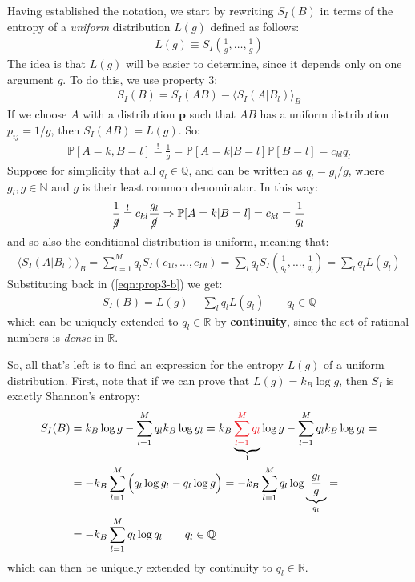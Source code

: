 \documentclass[../../main.tex]{subfiles}
\begin{document}
Having established the notation, we start by rewriting $S_I(B)$ in terms of the entropy of a \textit{uniform} distribution $L(g)$ defined as follows:
\begin{align*}
    L(g) \equiv S_{I}\left(\frac{1}{g},\dots,\frac{1}{g}\right)
\end{align*}
The idea is that $L(g)$ will be easier to determine, since it depends only on one argument $g$. To do this, we use property $3$:
\begin{align}\label{eqn:prop3-b}
    S_I(B) = S_I(AB) - \langle S_I(A|B_l) \rangle_B
\end{align}
If we choose $A$ with a distribution $\bm{p}$ such that $AB$ has a uniform distribution $p_{ij} = 1/g$, then $S_I(AB) = L(g)$. So:
\begin{align*}
    \mathbb{P}[A=k, B=l] \overset{!}{=} \frac{1}{g} = \mathbb{P}[A=k|B=l] \mathbb{P}[B=l] = c_{kl} q_l 
\end{align*}
Suppose for simplicity that all $q_l \in \mathbb{Q}$, and can be written as $q_l = g_l/g$, where $g_l, g \in \mathbb{N}$ and $g$ is their least common denominator. In this way:
\begin{align*}
    \frac{1}{\cancel{g}} \overset{!}{=}  c_{kl} \frac{g_l}{\cancel{g}} \Rightarrow \mathbb{P}[A=k|B=l] = c_{kl} = \frac{1}{g_l} 
\end{align*}
and so also the conditional distribution is uniform, meaning that:
\begin{align*}
    \langle S_I(A|B_l) \rangle_B = \sum_{l=1}^M q_l S_I(c_{1l},\dots, c_{\Omega l}) = \sum_l q_l S_I\left(\frac{1}{g_l},\dots,\frac{1}{g_l}  \right) = \sum_l q_l L(g_l)
\end{align*}
Substituting back in (\ref{eqn:prop3-b}) we get:
\begin{align*}
    S_I(B) = L(g) - \sum_l q_l L(g_l) \qquad q_l \in \mathbb{Q}
\end{align*}
which can be uniquely extended to $q_l \in \mathbb{R}$ by \textbf{continuity}, since the set of rational numbers is \textit{dense} in $\mathbb{R}$.

\medskip

So, all that's left is to find an expression for the entropy $L(g)$ of a uniform distribution. First, note that if we can prove that $L(g) = k_B \log g$, then $S_I$ is exactly Shannon's entropy:
\begin{align*}
    S_I(B) &= k_B \log g - \sum_{l=1}^M q_l k_B \log g_l = k_B \underbrace{\textcolor{Red}{\sum_{l=1}^M q_l}}_{1}  \log g - \sum_{l=1}^M q_l k_B \log g_l =\\
    &= -k_B \sum_{l=1}^M \Big( q_l \log g_l - q_l \log g \Big) = -k_B \sum_{l=1}^M q_l \log \underbrace{\frac{g_l}{g}}_{q_l} = \\
    &= -k_B \sum_{l=1}^M q_l \log q_l \qquad q_l \in \mathbb{Q}  
\end{align*}
which can then be uniquely extended by continuity to $q_l \in \mathbb{R}$.
\end{document}
